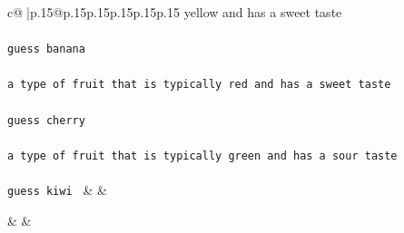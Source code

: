 \documentclass{article}
\begin{document}
{\begin{supertabular}{c@{$\;$}|p{.15\linewidth}@{}p{.15\linewidth}p{.15\linewidth}p{.15\linewidth}p{.15\linewidth}p{.15\linewidth}}
{{{yellow and has a sweet taste\\ \tt \\ \tt guess banana\\ \tt \\ \tt  a type of fruit that is typically red and has a sweet taste\\ \tt \\ \tt guess cherry\\ \tt \\ \tt  a type of fruit that is typically green and has a sour taste\\ \tt \\ \tt guess kiwi 
	  } 
	   } 
	   } 
	 & & \\ 
 

    \theutterance {}  

    & & 
\end{supertabular}}
\end{document}
